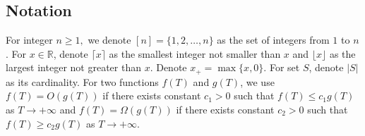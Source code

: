 \subsection{Notation}
For integer $n\ge 1,$ we denote $[n]=\{1,2,\dots,n\}$ as the set of integers from $1$ to $n$. For $x\in\mathbb{R}$, denote $\lceil x\rceil$ as the smallest integer not smaller than $x$ and $\lfloor x\rfloor$ as the largest integer not greater than $x$. Denote $x_+=\max\{x, 0\}$. For set $S$, denote $|S|$ as its cardinality. For two functions $f(T)$ and $g(T)$, we use $f(T)=O(g(T))$ if there exists constant $c_1>0$ such that $f(T)\le c_1g(T)$ as $T\to+\infty$ and $f(T)=\Omega(g(T))$ if there exists constant $c_2>0$ such that $f(T)\ge c_2g(T)$ as $T\to +\infty$.